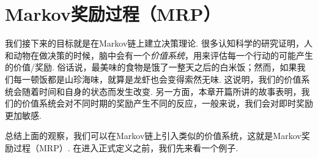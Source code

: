 \section{Markov奖励过程（MRP）}

我们接下来的目标就是在Markov链上建立决策理论. 很多认知科学的研究证明，人和动物在做决策的时候，脑中会有一个\emph{价值系统}，用来评估每一个行动的可能产生的价值/奖励. 俗话说，最美味的食物是饿了一整天之后的白米饭；然而，如果我们每一顿饭都是山珍海味，就算是龙虾也会变得索然无味. 这说明，我们的价值系统会随着时间和自身的状态而发生改变. 另一方面，本章开篇所讲的故事表明，我们的价值系统会对不同时期的奖励产生不同的反应，一般来说，我们会对即时奖励更加敏感.

总结上面的观察，我们可以在Markov链上引入类似的价值系统，这就是Markov奖励过程（MRP）. 在进入正式定义之前，我们先来看一个例子.

